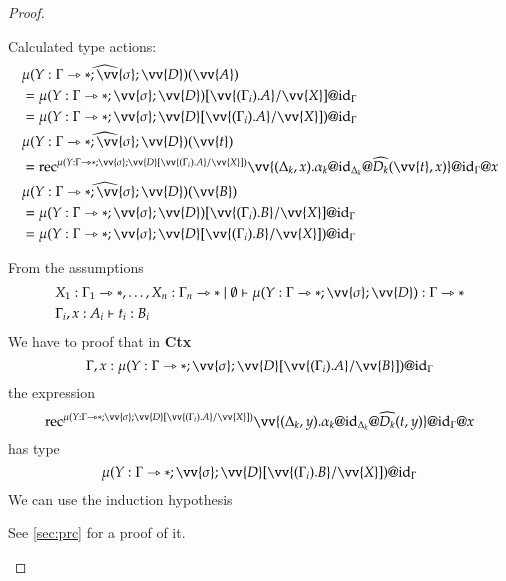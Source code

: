 \documentclass[a4paper,cleardoubleempty,BCOR1cm]{scrbook}
\begin{document}
\begin{proof}
\begin{itemize}
Calculated type actions:
\begin{align*}
  &\widehat{\mu(Y:\Gamma\rat*;\vv{\sigma};\vv{D})}(\vv{A})\\
  &=\mu(Y:\Gamma\rat*;\vv{\sigma};\vv{D})[\vv{(\Gamma_i).A}/\vv{X}]@\id{\Gamma}\\
  &=\mu(Y:\Gamma\rat*;\vv{\sigma};\vv{D}[\vv{(\Gamma_i).A}/\vv{X}])@\id{\Gamma}\\
  &\widehat{\mu(Y:\Gamma\rat*;\vv{\sigma};\vv{D})}(\vv{t})\\
  &=\text{rec}^{\mu(Y:\Gamma\rat*;\vv{\sigma};\vv{D}[\vv{(\Gamma_i).A}/\vv{X}])}\vv{(\Delta_k,x).\alpha_k@\id{\Delta_k}@\widehat{D_k}(\vv{t},x)}@\id{\Gamma}@x\\
  &\widehat{\mu(Y:\Gamma\rat*;\vv{\sigma};\vv{D})}(\vv{B})\\
  &=\mu(Y:\Gamma\rat*;\vv{\sigma};\vv{D})[\vv{(\Gamma_i).B}/\vv{X}]@\id{\Gamma}\\
  &=\mu(Y:\Gamma\rat*;\vv{\sigma};\vv{D}[\vv{(\Gamma_i).B}/\vv{X}])@\id{\Gamma}
\end{align*}

From the assumptions
\begin{align*}
&X_1:\Gamma_1\rat*,\dots,X_n:\Gamma_n\rat*\mid\emptyset\vdash \mu(Y:\Gamma\rat*;\vv{\sigma};\vv{D}):\Gamma\rat*\\
&\Gamma_i,x:A_i\vdash t_i:B_i
\end{align*}
We have to proof that in \textbf{Ctx}
\begin{equation*}
 \Gamma,x:\mu(Y:\Gamma\rat*;\vv{\sigma};\vv{D}[\vv{(\Gamma_i).A}/\vv{B}])@\id{\Gamma}
\end{equation*}
the expression
\begin{equation*}
 \text{rec}^{\mu(Y:\Gamma\rat*;\vv{\sigma};\vv{D}[\vv{(\Gamma_i).A}/\vv{X}])}\vv{(\Delta_k,y).\alpha_k@\id{\Delta_k}@\widehat{D_k}(t,y)}@\id{\Gamma}@x
\end{equation*}
has type
\begin{equation*}
\mu(Y:\Gamma\rat*;\vv{\sigma};\vv{D}[\vv{(\Gamma_i).B}/\vv{X}])@\id{\Gamma}
\end{equation*}
We can use the induction hypothesis
\begin{prooftree}
\end{prooftree}
See \ref{sec:prc} for a proof of it.


\end{itemize}
\end{proof}
\end{document}
